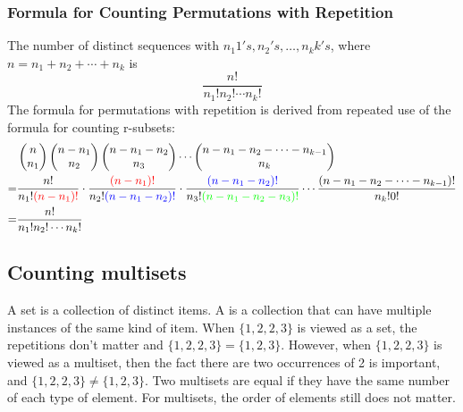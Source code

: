 \subsubsection*{Formula for Counting Permutations with Repetition}
The number of distinct sequences with $n_1 1's, n_2's, \ldots, n_k k's$, where $n = n_1 + n_2 + \cdots + n_k$ is
\[
  \frac{n!}{n_1!n_2!\cdots n_k!}
\]
The formula for permutations with repetition is derived from repeated use of the formula for counting r-subsets:
\begin{align*}
    & \begin{pmatrix}
        n \\ n_1
      \end{pmatrix} \begin{pmatrix}
                      n-n_1 \\ n_2
                    \end{pmatrix} \begin{pmatrix}
                                    n-n_1-n_2 \\ n_3
                                  \end{pmatrix} \cdots \begin{pmatrix}
                                                         n-n_1-n_2- \cdots - n_{k-1} \\ n_k
                                                       \end{pmatrix}                                                                                                                                                   \\
  = & \frac{n!}{n_1!{\color{red}(n-n_1)!}} \cdot \frac{{\color{red}(n-n_1)!}}{n_2!{\color{blue}(n-n_1-n_2)!}} \cdot \frac{\color{blue}(n-n_1-n_2)!}{n_3!{\color{green}(n-n_1-n_2-n_3)!}} \cdots \frac{(n-n_1-n_2-\cdots-n_{k-1})!}{n_k!0!} \\
  = & \frac{n!}{n_1!n_2!\cdots n_k!}
\end{align*}

\subsection{Counting multisets}
A set is a collection of distinct items. A  is a collection that can have multiple instances of the same kind of item. When $\{1,2,2,3\}$ is viewed as a set, the repetitions don't matter and $\{1,2,2,3\} = \{1,2,3\}$. However, when $\{1,2,2,3\}$ is viewed as a multiset, then the fact there are two occurrences of 2 is important, and $\{1,2,2,3\} \neq \{1,2,3\}$. Two multisets are equal if they have the same number of each type of element. For multisets, the order of elements still does not matter.

